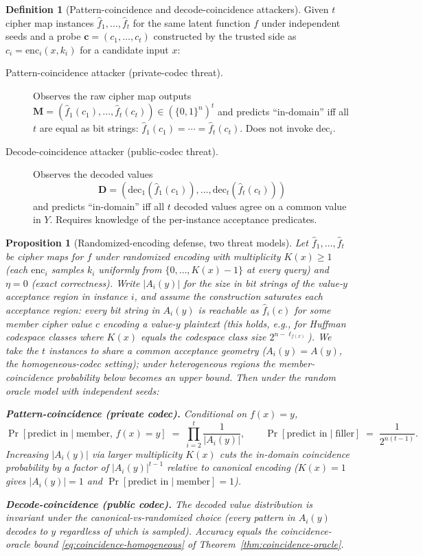 \documentclass[11pt]{article}
\theoremstyle{definition}
\newtheorem{definition}{Definition}[section]
\theoremstyle{plain}
\newtheorem{proposition}[theorem]{Proposition}
\theoremstyle{remark}
\newcommand{\fhat}{\hat{f}}
\newcommand{\enc}{\mathrm{enc}}
\newcommand{\dec}{\mathrm{dec}}
\newcommand{\B}{\{0,1\}}
\begin{document}
\begin{definition}[Pattern-coincidence and decode-coincidence attackers]
\label{def:pattern-decode-attackers}
Given $t$ cipher map instances $\fhat_1, \ldots, \fhat_t$ for the
same latent function $f$ under independent seeds and a probe
$\mathbf{c} = (c_1, \ldots, c_t)$ constructed by the trusted side as
$c_i = \enc_i(x, k_i)$ for a candidate input $x$:
\begin{description}
\item[Pattern-coincidence attacker (private-codec threat).]  Observes
    the raw cipher map outputs $\mathbf{M} = (\fhat_1(c_1), \ldots,
    \fhat_t(c_t)) \in (\B^n)^t$ and predicts ``in-domain'' iff all
    $t$ are equal as bit strings: $\fhat_1(c_1) = \cdots =
    \fhat_t(c_t)$.  Does not invoke $\dec_i$.
\item[Decode-coincidence attacker (public-codec threat).]  Observes
    the decoded values
    \[
    \mathbf{D} = (\dec_1(\fhat_1(c_1)), \ldots, \dec_t(\fhat_t(c_t)))
    \]
    and predicts ``in-domain'' iff all $t$ decoded values agree on a
    common value in $Y$.  Requires knowledge of the per-instance
    acceptance predicates.
\end{description}
\end{definition}

\begin{proposition}[Randomized-encoding defense, two threat models]
\label{prop:rand-encoding}
Let $\fhat_1, \ldots, \fhat_t$ be cipher maps for $f$ under
randomized encoding with multiplicity $K(x) \geq 1$ (each $\enc_i$
samples $k_i$ uniformly from $\{0, \ldots, K(x) - 1\}$ at every
query) and $\eta = 0$ (exact correctness).  Write $|A_i(y)|$ for
the size in bit strings of the value-$y$ acceptance region in
instance $i$, and assume the construction \emph{saturates} each
acceptance region: every bit string in $A_i(y)$ is reachable as
$\fhat_i(c)$ for some member cipher value $c$ encoding a value-$y$
plaintext (this holds, e.g., for Huffman codespace classes where
$K(x)$ equals the codespace class size $2^{n - \ell_{f(x)}}$).  We take
the $t$ instances to share a common acceptance geometry
($A_i(y) = A(y)$, the homogeneous-codec setting); under heterogeneous
regions the member-coincidence probability below becomes an upper bound.
Then under the random oracle model with independent seeds:

\textbf{Pattern-coincidence (private codec).}
Conditional on $f(x) = y$,
\[
\Pr[\text{predict in} \mid \text{member, } f(x) = y]
  \;=\; \prod_{i=2}^{t} \frac{1}{|A_i(y)|},
\qquad
\Pr[\text{predict in} \mid \text{filler}]
  \;=\; \frac{1}{2^{n(t-1)}}.
\]
Increasing $|A_i(y)|$ via larger multiplicity $K(x)$ cuts the
in-domain coincidence probability by a factor of $|A_i(y)|^{t-1}$
relative to canonical encoding ($K(x) = 1$ gives $|A_i(y)| = 1$ and
$\Pr[\text{predict in} \mid \text{member}] = 1$).

\textbf{Decode-coincidence (public codec).}
The decoded value distribution is invariant under the
canonical-vs-randomized choice (every pattern in $A_i(y)$ decodes to
$y$ regardless of which is sampled).  Accuracy equals the
coincidence-oracle bound \eqref{eq:coincidence-homogeneous} of
Theorem~\ref{thm:coincidence-oracle}.
\end{proposition}
\end{document}
